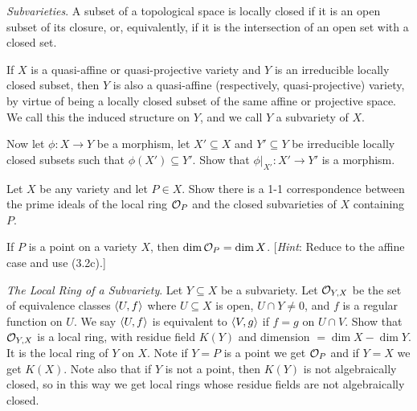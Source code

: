\documentclass[10pt]{amsart}
\begin{document}
\begin{exercise}[3.10]
    \emph{Subvarieties}. A subset of a topological space is locally closed if it is an 
    open subset of its closure, or, equivalently, if it is the intersection of an open set with 
    a closed set.
    
    If $X$ is a quasi-affine or quasi-projective variety and $Y$ is an irreducible locally closed 
    subset, then $Y$ is also a quasi-affine (respectively, quasi-projective) variety, by virtue 
    of being a locally closed subset of the same affine or projective space. We call this the induced 
    structure on $Y$, and we call $Y$ a subvariety of $X$.
    
    Now let $\phi:X \to Y$ be a morphism, let $X' \subseteq X$ and $Y' \subseteq Y$ be irreducible locally closed subsets 
    such that $\phi(X') \subseteq Y'$. Show that $\phi|_{X'} :X' \to Y'$ 
    is a morphism.
\end{exercise}


\begin{exercise}[3.11]
    Let $X$ be any variety and let $P \in X$. Show there is a 1-1 correspondence between
    the prime ideals of the local ring $\mathcal{O}_P$ and the closed subvarieties of $X$ containing $P$.
\end{exercise}


\begin{exercise}[3.12]
    If $P$ is a point on a variety $X$, then $\dim \mathcal{O}_P = \dim X$. [\emph{Hint}: Reduce to the
    affine case and use (3.2c).]
\end{exercise}


\begin{exercise}[3.13]
    \emph{The Local Ring of a Subvariety}. Let $Y \subseteq X$ be a subvariety. Let $\mathcal{O}_{Y,X}$ be the set 
    of equivalence classes $\left\langle U,f\right\rangle$ where $U \subseteq X$ is open, $U \cap Y \ne 0$, and $f$ is a regular 
    function on $U$. We say $\left\langle U, f\right\rangle$ is equivalent to $\left\langle V, g\right\rangle$ if $f = g$ on $U \cap V$. Show that 
    $\mathcal{O}_{Y,X}$ is a local ring, with residue field $K(Y)$ and dimension $= \dim X - \dim Y$. It is the local ring 
    of $Y$ on $X$. Note if $Y = P$ is a point we get $\mathcal{O}_{P}$ and if $Y = X$ we get $K(X)$. 
    Note also that if $Y$ is not a point, then $K(Y)$ is not algebraically closed, so in this way we 
    get local rings whose residue fields are not algebraically closed.
\end{exercise}
\end{document}
